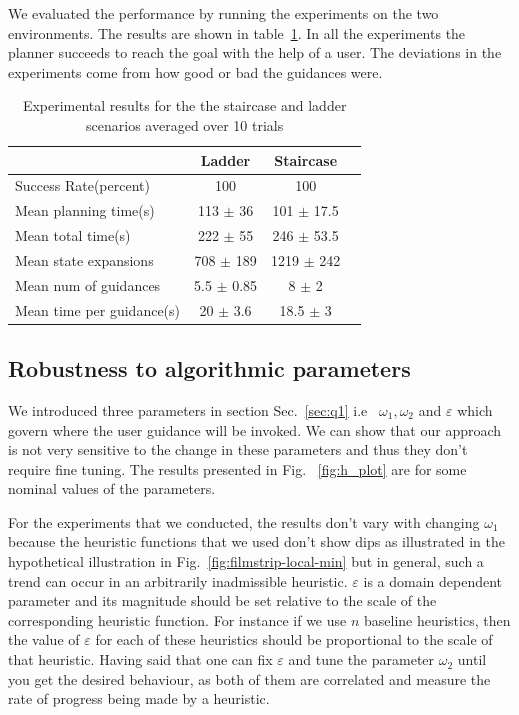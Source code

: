 \documentclass{article}
\begin{document}
We evaluated the performance by running the experiments on the two environments. The results are shown in table~\ref{tab:stats}. In all the experiments the planner succeeds to reach the goal with the help of a user. The deviations in the experiments come from how good or bad the guidances were.

\begin{table}[t!]
\centering
\begin{tabular}{l|ccc}	
      & Ladder & Staircase\\ 
        \hline
            Success Rate(percent) & 100 & 100\\
            Mean planning time(s) & 113 $\pm$ 36 & 101 $\pm$ 17.5\\
            Mean total time(s) & 222 $\pm$ 55 & 246 $\pm$ 53.5\\
       Mean state expansions & 708 $\pm$ 189 & 1219 $\pm$ 242\\
      Mean num of guidances & 5.5 $\pm$ 0.85 & 8 $\pm$ 2\\
      Mean time per guidance(s) & 20 $\pm$ 3.6 & 18.5 $\pm$ 3\\
\end{tabular}
\caption{Experimental results for the the staircase and ladder scenarios averaged over 10 trials}\label{tab:stats}
\end{table}

\subsection{Robustness to algorithmic parameters}
We introduced three parameters in section Sec.~\ref{sec:q1} i.e ~$\omega_1, \omega_2$ and $\varepsilon$ which govern where the user guidance will be invoked. We can show that our approach is not very sensitive to the change in these parameters and thus they don't require fine tuning. The results presented in Fig. ~\ref{fig:h_plot} are for some nominal values of the parameters. 

For the experiments that we conducted, the results don't vary with changing $\omega_1$ because the heuristic functions that we used don't show dips as illustrated in the hypothetical illustration in Fig.~\ref{fig:filmstrip-local-min} but in general, such a trend can occur in an arbitrarily inadmissible heuristic. $\varepsilon$ is a domain dependent parameter and its magnitude should be set relative to the scale of the corresponding heuristic function. For instance if we use $n$ baseline heuristics, then the value of $\varepsilon$ for each of these heuristics should be proportional to the scale of that heuristic. Having said that one can fix $\varepsilon$ and tune the parameter $\omega_2$ until you get the desired behaviour, as both of them are correlated and measure the rate of progress being made by a heuristic. 
\end{document}
